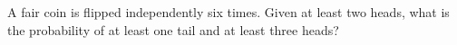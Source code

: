 A fair coin is flipped independently six times. Given at least two heads, what is the probability of at least one tail and at least three heads?
